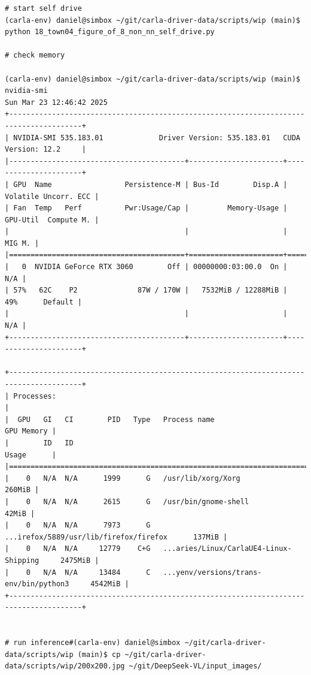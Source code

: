 \begin{verbatim}
# start self drive
(carla-env) daniel@simbox ~/git/carla-driver-data/scripts/wip (main)$ python 18_town04_figure_of_8_non_nn_self_drive.py 

# check memory

(carla-env) daniel@simbox ~/git/carla-driver-data/scripts/wip (main)$ nvidia-smi
Sun Mar 23 12:46:42 2025       
+---------------------------------------------------------------------------------------+
| NVIDIA-SMI 535.183.01             Driver Version: 535.183.01   CUDA Version: 12.2     |
|-----------------------------------------+----------------------+----------------------+
| GPU  Name                 Persistence-M | Bus-Id        Disp.A | Volatile Uncorr. ECC |
| Fan  Temp   Perf          Pwr:Usage/Cap |         Memory-Usage | GPU-Util  Compute M. |
|                                         |                      |               MIG M. |
|=========================================+======================+======================|
|   0  NVIDIA GeForce RTX 3060        Off | 00000000:03:00.0  On |                  N/A |
| 57%   62C    P2              87W / 170W |   7532MiB / 12288MiB |     49%      Default |
|                                         |                      |                  N/A |
+-----------------------------------------+----------------------+----------------------+
                                                                                         
+---------------------------------------------------------------------------------------+
| Processes:                                                                            |
|  GPU   GI   CI        PID   Type   Process name                            GPU Memory |
|        ID   ID                                                             Usage      |
|=======================================================================================|
|    0   N/A  N/A      1999      G   /usr/lib/xorg/Xorg                          260MiB |
|    0   N/A  N/A      2615      G   /usr/bin/gnome-shell                         42MiB |
|    0   N/A  N/A      7973      G   ...irefox/5889/usr/lib/firefox/firefox      137MiB |
|    0   N/A  N/A     12779    C+G   ...aries/Linux/CarlaUE4-Linux-Shipping     2475MiB |
|    0   N/A  N/A     13484      C   ...yenv/versions/trans-env/bin/python3     4542MiB |
+---------------------------------------------------------------------------------------+


# run inference#(carla-env) daniel@simbox ~/git/carla-driver-data/scripts/wip (main)$ cp ~/git/carla-driver-data/scripts/wip/200x200.jpg ~/git/DeepSeek-VL/input_images/


\end{verbatim}
